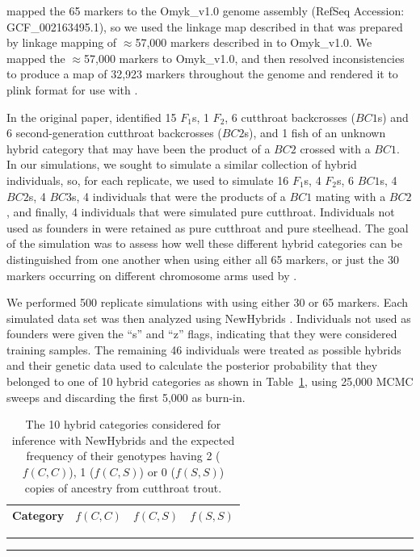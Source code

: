 {\citeauthor{rizza2023limited} mapped the 65 markers to the Omyk\_v1.0 genome assembly (RefSeq 
Accession: GCF\_002163495.1), so we used
the linkage map described in \citep{pearse2019sex} that was prepared by linkage mapping 
of $\approx$57,000 markers described in \citet{palti2015development} to Omyk\_v1.0. We mapped the $\approx$57,000 markers to Omyk\_v1.0, and then resolved inconsistencies to produce a map
of 32,923 markers throughout the genome and rendered it to plink format for use with \gscramble{}.

In the original paper, \citet{rizza2023limited} identified 15 $F_1$s,
1 $F_2$,
6 cutthroat backcrosses ($BC1$s) and 
6 second-generation cutthroat backcrosses ($BC2$s),
and 1 fish of an unknown hybrid category that may have been the
product of a $BC2$ crossed with a $BC1$.   In our simulations, we sought to simulate
a similar collection of hybrid individuals, so, for each replicate, we used
\gscramble{} to simulate 16 $F_1$s, 4 $F_2$s, 6 $BC1$s, 4 $BC2$s, 4 $BC3$s,  4 individuals
that were the products of a $BC1$ mating with a $BC2$, and finally, 4 individuals that were simulated pure cutthroat. Individuals not used as founders
in \gscramble{} were retained as pure cutthroat and pure steelhead.  The goal of the simulation
was to assess how well these different hybrid categories can be distinguished from one another
when using either all 65 markers, or just the 30 markers occurring on different chromosome arms
used by  \citet{rizza2023limited}.

We performed 500 replicate simulations with \gscramble{} using either 30 or 65 markers.  Each
simulated data set was then analyzed using {\sc NewHybrids} \citep{anderson2002model}. Individuals not used as founders were given the ``s'' and ``z'' flags, indicating that they were considered training samples.  The remaining 46 individuals were treated as possible hybrids and their genetic data used to calculate the posterior probability that they belonged to one of 10 hybrid categories as shown in Table~\ref{tab:newhybcats}, using 25,000 MCMC sweeps and discarding the first 5,000 as burn-in.
\begin{table}
\caption{The 10 hybrid categories considered for inference with {\sc NewHybrids} and the
expected frequency of their genotypes having 2 ($f(C,C)$), 1 ($f(C,S)$) or 0 ($f(S,S)$) copies of ancestry from cutthroat trout.}
\label{tab:newhybcats}
{\small
\begin{tabular*}{\columnwidth}{@{\extracolsep{\fill}} lrrr}
\hline\hline
Category	& $f(C,C)$ &	$f(C,S)$ & 	$f(S,S)$ \\ \hline

\end{tabular*}
}
\vspace*{-2.3ex}\hrule\vspace*{0.3ex}\hrule
\end{table}



}
